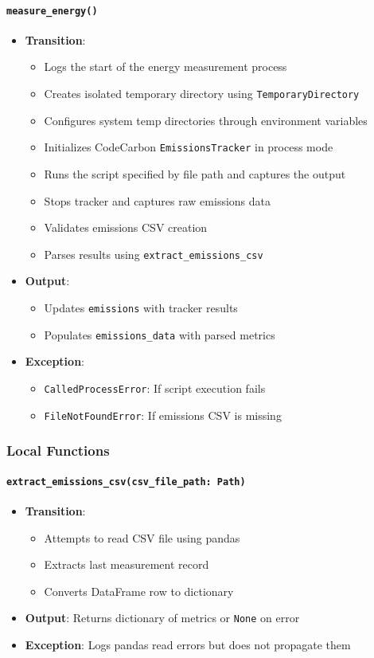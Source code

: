 \documentclass[12pt, titlepage]{article}
\begin{document}
\paragraph{\texttt{measure\_energy()}}
\begin{itemize}
\item \textbf{Transition}:
\begin{itemize}
\item Logs the start of the energy measurement process
\item Creates isolated temporary directory using \texttt{TemporaryDirectory}
\item Configures system temp directories through environment variables
\item Initializes CodeCarbon \texttt{EmissionsTracker} in process mode
\item Runs the script specified by file path and captures the output
\item Stops tracker and captures raw emissions data
\item Validates emissions CSV creation
\item Parses results using \texttt{extract\_emissions\_csv}
\end{itemize}
\item \textbf{Output}:
\begin{itemize}
\item Updates \texttt{emissions} with tracker results
\item Populates \texttt{emissions\_data} with parsed metrics
\end{itemize}
\item \textbf{Exception}:
\begin{itemize}
\item \texttt{CalledProcessError}: If script execution fails
\item \texttt{FileNotFoundError}: If emissions CSV is missing
\end{itemize}
\end{itemize}

\subsubsection{Local Functions}

\paragraph{\texttt{extract\_emissions\_csv(csv\_file\_path: Path)}}
\begin{itemize}
  \item \textbf{Transition}:
  \begin{itemize}
    \item Attempts to read CSV file using pandas
    \item Extracts last measurement record
    \item Converts DataFrame row to dictionary
  \end{itemize}
  \item \textbf{Output}: Returns dictionary of metrics or \texttt{None} on error
  \item \textbf{Exception}: Logs pandas read errors but does not propagate them
\end{itemize}
  
\end{document}
